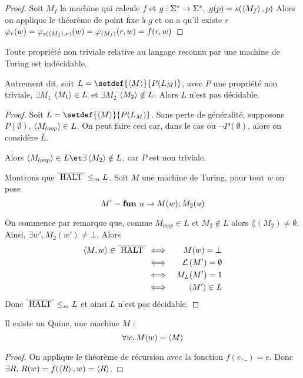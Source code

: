 \begin{proof}
	Soit $M_f$ la machine qui calcule $f$ et $g : \Sigma^{*} \to \Sigma^{*}, \ g(p) = s(\left\langle M_f\right\rangle, p)$
	Alors on applique le théorème de point fixe à $g$ et on a qu'il existe $r$ \tq $\varphi_r(w)
		=\varphi_{s(\left\langle M_f\right\rangle,r)} (w) = \varphi_{\left\langle M_f\right\rangle} (r,w) = f(r,w)$
\end{proof}


\begin{theorem}[de Rice]
	Toute propriété non triviale relative au langage reconnu par une machine de Turing est indécidable.

	Autrement dit, soit $L = \setdef {\encode M} {P(L_M)}$, avec $P$ une propriété non triviale, \ie $\exists M_1$ \tq
	$\left\langle M_1\right\rangle \in L$ et $\exists M_2$ \tq $\left\langle M_2\right\rangle \notin L$. Alors $L$ n'est pas décidable.
\end{theorem}


\begin{proof}
	Soit $L = \setdef {\encode M} {P(L_M)}$.
	Sans perte de généralité, supposons $P(\emptyset)$, \ie $\left\langle M_{loop}\right\rangle \in L$.
	On peut faire ceci car, dans le cas ou $\lnot P (\emptyset)$, alors on considère $\bar L$.

	Alors $\encode {M_{loop}} \in L \et \exists \encode{M_2} \notin L$, car $P$ est non triviale.

	Montrons que $\overline {\text{ HALT }} \leq_m L$.
	Soit $M$ une machine de Turing, pour tout $w$ on pose
	$$M' = \textbf{fun } u \rightarrow M(w); M_2(u)$$

	On commence par remarque que, comme $M_{loop} \in L$ et $M_2 \notin L$ alors $\lang (M_2) \neq \emptyset$. Ainsi,
	$\exists w', M_2(w') \neq \bot$.
	Alors
	\begin{eqnarray*}
		\left\langle M,w\right\rangle \in \overline{\text{ HALT }}  &\iff& M(w) = \bot \\
		&\iff& \mathcal{L}\left(M'\right) = \emptyset \\
		&\iff& M_L (M') = 1 \\
		&\iff& \left\langle M'\right\rangle \in L
	\end{eqnarray*}
	Donc $\overline {\text{ HALT }} \leq_m L$ et ainsi $L$ n'est pas décidable.
\end{proof}



\begin{prop}
	Il existe un Quine, \ie une machine $M$ \tq :
	$$\forall w, M(w) = \left\langle M\right\rangle$$
\end{prop}

\begin{proof}
	On applique le théorème de récursion avec la fonction $f(e, \_) = e$. Donc $\exists R, \, R(w) = f(\left\langle R\right\rangle, w) = \left\langle R\right\rangle$.
\end{proof}

